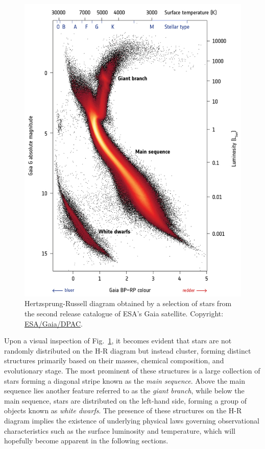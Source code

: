 \documentclass[main.tex]{subfiles}
\begin{document}
    \begin{figure}[h!]
        \centering
        \includegraphics[scale=1.1]{figures/chapter1/hrd_gaia.jpg}
        \caption{Hertzsprung-Russell diagram obtained by a selection of stars from the second release catalogue of ESA's Gaia satellite. Copyright: \href{https://sci.esa.int/web/gaia/-/60198-gaia-hertzsprung-russell-diagram}{ESA/Gaia/DPAC}.}
        \label{fig:hrd_gaia}
    \end{figure}

    Upon a visual inspection of Fig.~\ref{fig:hrd_gaia}, it becomes evident that stars are not randomly distributed on the H-R diagram but instead cluster, forming distinct structures primarily based on their masses, chemical composition, and evolutionary stage. The most prominent of these structures is a large collection of stars forming a diagonal stripe known as the \textit{main sequence}. Above the main sequence lies another feature referred to as the \textit{giant branch}, while below the main sequence, stars are distributed on the left-hand side, forming a group of objects known as \textit{white dwarfs}. The presence of these structures on the H-R diagram implies the existence of underlying physical laws governing observational characteristics such as the surface luminosity and temperature, which will hopefully become apparent in the following sections.
\end{document}
